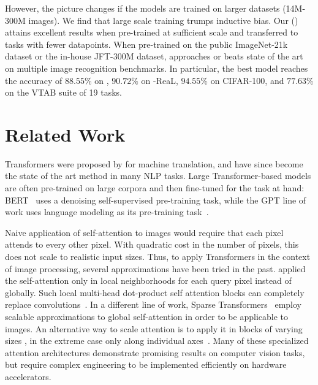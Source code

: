However, the picture changes if the models are trained on larger datasets (14M-300M images). 
We find that large scale training trumps inductive bias.
Our \oursfull{} (\oursabbrv{}) attains excellent results when pre-trained at sufficient scale and transferred to tasks with fewer datapoints.
When pre-trained on the public ImageNet-21k dataset or the in-house JFT-300M dataset, \oursabbrv{} approaches or beats state of the art on multiple image recognition benchmarks.
In particular, the best model reaches the accuracy of $88.55\%$ on \imagenet, $90.72\%$ on \imagenet-ReaL, $94.55\%$ on CIFAR-100, and $77.63\%$ on the VTAB suite of 19 tasks.


















\section{Related Work}

Transformers were proposed by \citet{vaswani2017} for machine translation, and have since become the state of the art method in many NLP tasks. Large Transformer-based models are often pre-trained on large corpora and then fine-tuned for the task at hand: BERT~\citep{devlin19-bert} uses a denoising self-supervised pre-training task, while the GPT line of work uses language modeling as its pre-training task~\citep{radford2018-gpt,radford2019-gpt2,brown2020-gpt3}.

Naive application of self-attention to images would require that each pixel attends to every other pixel. With quadratic cost in the number of pixels, this does not scale to realistic input sizes.
Thus, to apply Transformers in the context of image processing, several approximations have been tried in the past.
\citet{parmar18-imagetransformer} applied the self-attention only in local neighborhoods for each query pixel instead of globally.
Such local multi-head dot-product self attention blocks can completely replace convolutions~\citep{hu2019local,ramachandran19-sasa,zhao2020-san}.
In a different line of work, Sparse Transformers~\citep{child2019-sparsetransformers} employ scalable approximations to global self-attention in order to be applicable to images.
An alternative way to scale attention is to apply it in blocks of varying sizes \citep{weissenborn2019-savm}, in the extreme case only along individual axes~\citep{ho2019-axialattention,wang2020-axialdeeplab}.
Many of these specialized attention architectures demonstrate promising results on computer vision tasks, but require complex engineering to be implemented efficiently on hardware accelerators.

